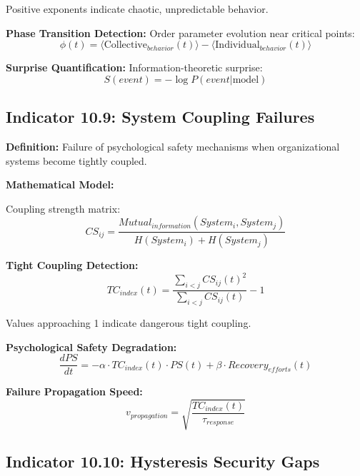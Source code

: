 \documentclass[11pt,a4paper]{article}
\begin{document}
Positive exponents indicate chaotic, unpredictable behavior.

\textbf{Phase Transition Detection:}
Order parameter evolution near critical points:
\begin{equation}
\phi(t) = \langle \text{Collective}_{behavior}(t) \rangle - \langle \text{Individual}_{behavior}(t) \rangle
\end{equation}

\textbf{Surprise Quantification:}
Information-theoretic surprise:
\begin{equation}
S(event) = -\log P(event|\text{model})
\end{equation}

\subsection{Indicator 10.9: System Coupling Failures}

\textbf{Definition:} Failure of psychological safety mechanisms when organizational systems become tightly coupled.

\textbf{Mathematical Model:}

Coupling strength matrix:
\begin{equation}
CS_{ij} = \frac{Mutual_{information}(System_i, System_j)}{H(System_i) + H(System_j)}
\end{equation}

\textbf{Tight Coupling Detection:}
\begin{equation}
TC_{index}(t) = \frac{\sum_{i<j} CS_{ij}(t)^2}{\sum_{i<j} CS_{ij}(t)} - 1
\end{equation}

Values approaching 1 indicate dangerous tight coupling.

\textbf{Psychological Safety Degradation:}
\begin{equation}
\frac{dPS}{dt} = -\alpha \cdot TC_{index}(t) \cdot PS(t) + \beta \cdot Recovery_{efforts}(t)
\end{equation}

\textbf{Failure Propagation Speed:}
\begin{equation}
v_{propagation} = \sqrt{\frac{TC_{index}(t)}{\tau_{response}}}
\end{equation}

\subsection{Indicator 10.10: Hysteresis Security Gaps}
\end{document}
